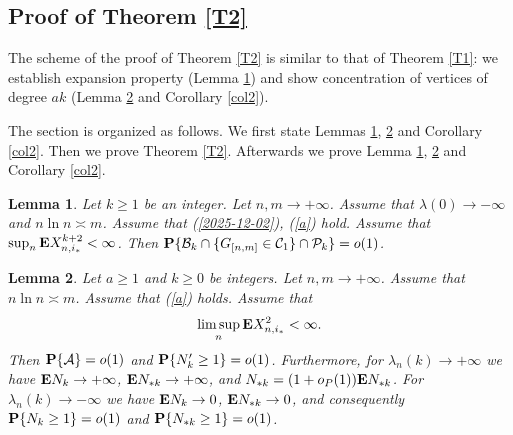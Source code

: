 \documentclass[11pt, a4paper]{article}
\newcommand{\E}{{\bf{E}}}
\newcommand{\PP}{{\bf{P}}}
\newtheorem{lem}{Lemma}
\begin{document}
\subsection{Proof of Theorem \ref{T2}}


The scheme of the proof of Theorem \ref{T2} is similar to that of Theorem \ref{T1}: we establish
 expansion property (Lemma \ref{L2.2}) and  show
  concentration of vertices of 
degree $ak$  (Lemma \ref{L1} and  Corollary 
\ref{col2}).


The section is organized as follows. We first state Lemmas 
 \ref{L2.2},
 \ref{L1}
  and Corollary 
\ref{col2}. Then we prove Theorem \ref{T2}. Afterwards we prove 
Lemma 
\ref{L2.2}, \ref{L1} and Corollary 
\ref{col2}.









\begin{lem}\label{L2.2}
 Let $k\ge 1$ be an integer. Let $n,m\to+\infty$.
  Assume that 
 $\lambda(0)\to-\infty$ and $n\ln n\asymp m$.
 Assume that 
 (\ref{2025-12-02}),
(\ref{a}) hold.
   Assume that $\sup_n\E X_{n,i_*}^{k+2}<\infty$. Then 
 $
 \PP\{{\cal B}_{k}\cap \{G_{[n,m]}\in {\cal C}_1\}\cap {\cal P}_k\}=o(1)
 $.
\end{lem}


\begin{lem}\label{L1} Let $a\ge 1$ and $k\ge 0$ be integers. Let $n,m\to+\infty$. Assume that
$n\ln n\asymp m$. Assume that (\ref{a}) holds. Assume that
\begin{align}
\label{condition_X^2}
\limsup_n\E X_{n,i_*}^2<\infty.
\end{align}
Then 
$\PP\{{\cal A}\}=o(1)$
and 
$\PP\{N'_k\ge 1\}=o(1)$.
Furthermore, 
for $\lambda_n(k)\to+\infty$
we have
$\E N_k\to+\infty$, $\E N_{*k}\to+\infty$, and
$N_{*k}=(1+o_P(1))\E N_{*k}$.
For $\lambda_n(k)\to-\infty$
we have $\E N_k\to 0$, $\E N_{*k}\to 0$, and
consequently $\PP\{N_k\ge 1\}=o(1)$ and $\PP\{N_{*k}\ge 1\}=o(1)$.
\end{lem}
\end{document}
